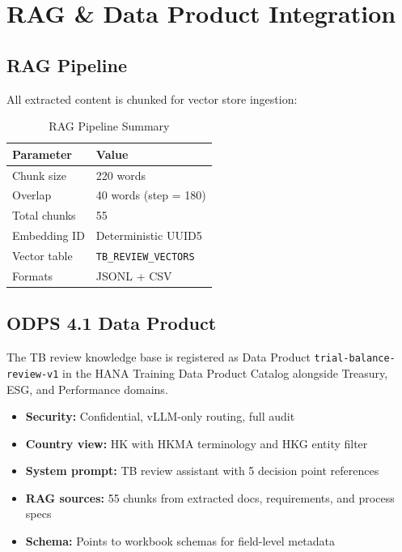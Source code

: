 \documentclass[11pt,a4paper]{article}
\begin{document}
\section{RAG \& Data Product Integration}
\label{sec:integration}

\subsection{RAG Pipeline}

All extracted content is chunked for vector store ingestion:

\begin{table}[H]
\centering
\caption{RAG Pipeline Summary}
\begin{tabular}{ll}
\toprule
\textbf{Parameter} & \textbf{Value} \\
\midrule
Chunk size & 220 words \\
Overlap & 40 words (step = 180) \\
Total chunks & 55 \\
Embedding ID & Deterministic UUID5 \\
Vector table & \texttt{TB\_REVIEW\_VECTORS} \\
Formats & JSONL + CSV \\
\bottomrule
\end{tabular}
\end{table}

\subsection{ODPS 4.1 Data Product}

The TB review knowledge base is registered as Data Product \texttt{trial-balance-review-v1}
in the HANA Training Data Product Catalog alongside Treasury, ESG, and Performance domains.

\begin{itemize}[nosep]
    \item \textbf{Security:} Confidential, vLLM-only routing, full audit
    \item \textbf{Country view:} HK with HKMA terminology and HKG entity filter
    \item \textbf{System prompt:} TB review assistant with 5 decision point references
    \item \textbf{RAG sources:} 55 chunks from extracted docs, requirements, and process specs
    \item \textbf{Schema:} Points to workbook schemas for field-level metadata
\end{itemize}
\end{document}
